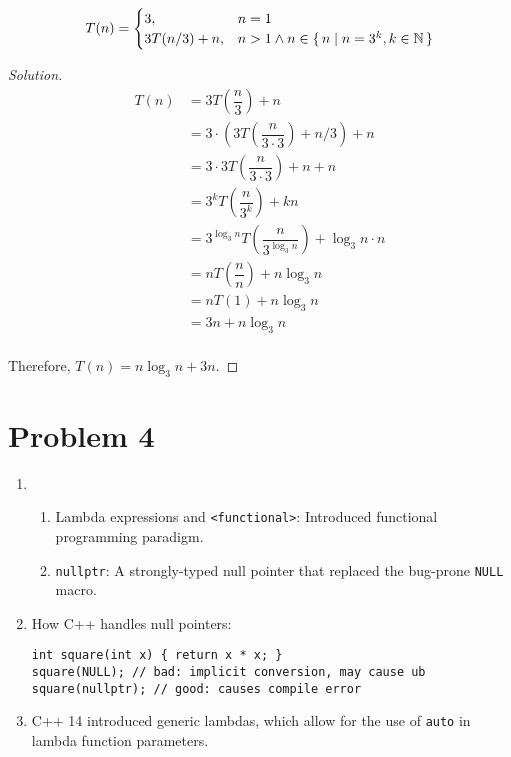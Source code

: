 \documentclass[12pt]{article}
\theoremstyle{definition}
\newenvironment{solution}
{\renewcommand\qedsymbol{$\blacksquare$}
\begin{proof}[Solution]}
  {
\end{proof}}
\begin{document}
\[
  T(n) =
  \begin{cases}
    3, & n = 1 \\
    3T(n / 3) + n, & n > 1 \land n \in \set{n \mid n = 3^k, k \in \mathbb N}
  \end{cases}
\]

\begin{solution}
  \begin{align*}
    T(n) & = 3T\left(\dfrac{n}{3}\right) + n \\
    & = 3 \cdot \left(3T\left(\dfrac{n}{3 \cdot 3}\right) + n / 3\right) + n \\
    & = 3 \cdot 3T\left(\dfrac{n}{3 \cdot 3}\right) + n + n \\
    & = 3^kT\left(\dfrac{n}{3^k}\right) + kn \\
    & = 3^{\log_3 n}T\left(\dfrac{n}{3^{\log_3 n}}\right) + \log_3 n \cdot n \\
    & = nT\left(\dfrac{n}{n}\right) + n \log_3 n \\
    & = nT(1) + n \log_3 n \\
    & = 3n + n \log_3 n \\
  \end{align*}

  Therefore, $T(n) = n \log_3 n + 3n$.
\end{solution}

\section{Problem 4}

\begin{enumerate}[label=(\alph*)]
  \item
    \begin{enumerate}[label=(\roman*)]
      \item Lambda expressions and \verb|<functional>|: Introduced
        functional programming paradigm.
      \item \verb|nullptr|: A strongly-typed null pointer that
        replaced the bug-prone \verb|NULL| macro.
    \end{enumerate}
  \item How C++ handles null pointers:
    \begin{verbatim}
int square(int x) { return x * x; }
square(NULL); // bad: implicit conversion, may cause ub
square(nullptr); // good: causes compile error
    \end{verbatim}
  \item C++ 14 introduced generic lambdas, which allow for the use of
    \verb|auto| in lambda function parameters.
\end{enumerate}
\end{document}
